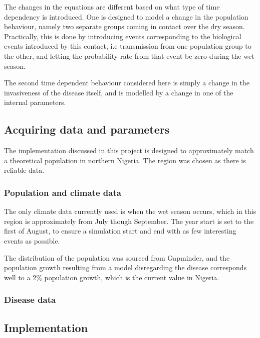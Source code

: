 \documentclass[10pt,a4paper]{article}
\begin{document}
The changes in the equations are different based on what type of time dependency is introduced. One is designed to model a change in the population behaviour, namely two separate groups coming in contact over the dry season. Practically, this is done by introducing events corresponding to the biological events introduced by this contact, i.e transmission from one population group to the other, and letting the probability rate from that event be zero during the wet season.

The second time dependent behaviour considered here is simply a change in the invasiveness of the disease itself, and is modelled by a change in one of the internal parameters.

\subsection{Acquiring data and parameters}

The implementation discussed in this project is designed to approximately match a theoretical population in northern Nigeria. The region was chosen as there is reliable data.

\subsubsection{Population and climate data}

The only climate data currently used is when the wet season occurs, which in this region is approximately from July though September. The year start is set to the first of August, to ensure a simulation start and end with as few interesting events as possible.

The distribution of the population was sourced from Gapminder, and the population growth resulting from a model disregarding the disease corresponds well to a 2\% population growth, which is the current value in Nigeria.



\subsubsection{Disease data}

\subsection{Implementation}
\end{document}
